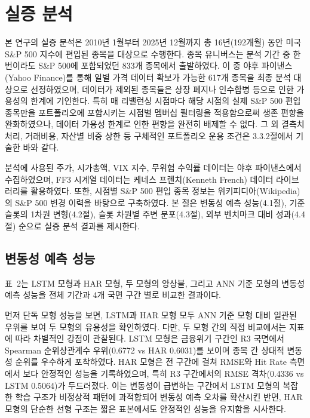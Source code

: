 \documentclass{article}
\begin{document}
\section{실증 분석}\label{sec:result}

본 연구의 실증 분석은 2010년 1월부터 2025년 12월까지 총 16년(192개월) 동안 미국 S\&P 500 지수에 편입된 종목을 대상으로 수행한다. 종목 유니버스는 분석 기간 중 한 번이라도 S\&P 500에 포함되었던 833개 종목에서 출발하였다. 이 중 야후 파이낸스(Yahoo Finance)를 통해 일별 가격 데이터 확보가 가능한 617개 종목을 최종 분석 대상으로 선정하였으며, 데이터가 제외된 종목들은 상장 폐지나 인수합병 등으로 인한 가용성의 한계에 기인한다. 특히 매 리밸런싱 시점마다 해당 시점의 실제 S\&P 500 편입 종목만을 포트폴리오에 포함시키는 시점별 멤버십 필터링을 적용함으로써 생존 편향을 완화하였으나, 데이터 가용성 한계로 인한 편향을 완전히 배제할 수 없다. 그 외 결측치 처리, 거래비용, 자산별 비중 상한 등 구체적인 포트폴리오 운용 조건은 3.3.2절에서 기술한 바와 같다.

분석에 사용된 주가, 시가총액, VIX 지수, 무위험 수익률 데이터는 야후 파이낸스에서 수집하였으며, FF3 시계열 데이터는 케네스 프렌치(Kenneth French) 데이터 라이브러리를 활용하였다. 또한, 시점별 S\&P 500 편입 종목 정보는 위키피디아(Wikipedia)의 S\&P 500 변경 이력을 바탕으로 구축하였다. 본 절은 변동성 예측 성능(4.1절), 기준 슬롯의 1차원 변형(4.2절), 슬롯 차원별 주변 분포(4.3절), 외부 벤치마크 대비 성과(4.4절) 순으로 실증 분석 결과를 제시한다.

\subsection{변동성 예측 성능}\label{subsec:vol_pred_eval}

표~2는 LSTM 모형과 HAR 모형, 두 모형의 앙상블, 그리고 ANN 기준 모형의 변동성 예측 성능을 전체 기간과 4개 국면 구간 별로 비교한 결과이다.

먼저 단독 모형 성능을 보면, LSTM과 HAR 모형 모두 ANN 기준 모형 대비 일관된 우위를 보여 두 모형의 유용성을 확인하였다. 다만, 두 모형 간의 직접 비교에서는 지표에 따라 차별적인 강점이 관찰된다. LSTM 모형은 금융위기 구간인 R3 국면에서 Spearman 순위상관계수 우위(0.6772 vs HAR 0.6031)를 보이며 종목 간 상대적 변동성 순위를 우수하게 포착하였다. HAR 모형은 전 구간에 걸쳐 RMSE와 Hit Rate 측면에서 보다 안정적인 성능을 기록하였으며, 특히 R3 구간에서의 RMSE 격차(0.4336 vs LSTM 0.5064)가 두드러졌다. 이는 변동성이 급변하는 구간에서 LSTM 모형의 복잡한 학습 구조가 비정상적 패턴에 과적합되어 변동성 예측 오차를 확산시킨 반면, HAR 모형의 단순한 선형 구조는 짧은 표본에서도 안정적인 성능을 유지함을 시사한다. 
\end{document}
